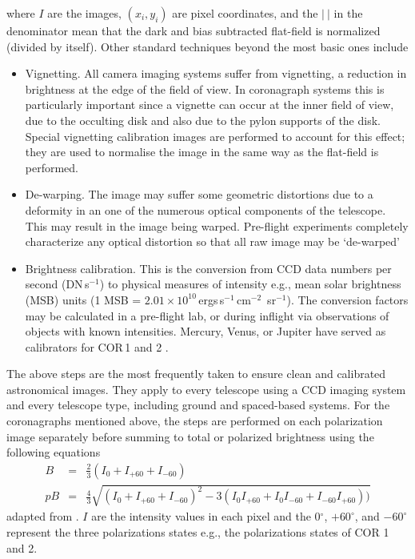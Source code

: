 where $I$ are the images, $(x_i, y_i)$ are pixel coordinates, and the $|~|$ in the denominator mean that the dark and bias subtracted flat-field is normalized (divided by itself). Other standard techniques beyond the most basic ones include
\begin{itemize}
%
%
\item Vignetting. All camera imaging systems suffer from vignetting, a reduction in brightness at the edge of the field of view. In coronagraph systems this is particularly important since a vignette can occur at the inner field of view, due to the occulting disk and also due to the pylon supports of the disk. Special vignetting calibration images are performed to account for this effect; they are used to normalise the image in the same way as the flat-field is performed.
%
%
\item De-warping. The image may suffer some geometric distortions due to a deformity in an one of the numerous optical components of the telescope. This may result in the image being warped. Pre-flight experiments completely characterize any optical distortion so that all raw image may be `de-warped'
%
%
\item Brightness calibration. This is the conversion from CCD data numbers per second (DN\,s$^{-1}$) to physical measures of intensity e.g., mean solar brightness (MSB) units (1 MSB = $2.01\times10^{10}$\,ergs\,s$^{-1}$\,cm$^{-2}$\, sr$^{-1}$). The conversion factors may be calculated in a pre-flight lab, or during inflight via observations of objects with known intensities. Mercury, Venus, or Jupiter have served as calibrators for COR\,1 and 2 \citep{thomp2008}.
\end{itemize}
The above steps are the most frequently taken to ensure clean and calibrated astronomical images. They apply to every telescope using a CCD imaging system and every telescope type, including ground and spaced-based systems. For the coronagraphs mentioned above, the steps are performed on each polarization image separately before summing to total or polarized brightness using the following equations
\begin{eqnarray}
B &=& \frac{2}{3}(I_0 + I_{+60} + I_{-60}) \\
pB &=& \frac{4}{3}\sqrt{(I_0 + I_{+60} + I_{-60})^2 - 3(I_0I_{+60} + I_0I_{-60} + I_{-60}I_{+60}) )}
\end{eqnarray}
adapted from \citet{billings1966}. $I$ are the intensity values in each pixel and the 0$^{\circ}$, $+60^{\circ}$, and $-60^{\circ}$ represent the three polarizations states e.g., the polarizations states of COR 1 and 2.


